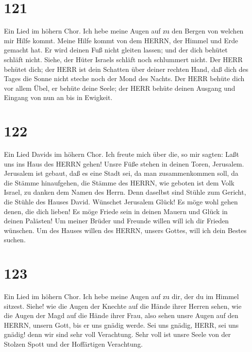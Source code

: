 \hypertarget{section-120}{%
\section{121}\label{section-120}}

 Ein Lied im höhern Chor. Ich hebe meine Augen auf zu den
Bergen von welchen mir Hilfe kommt.  Meine Hilfe kommt von
dem HERRN, der Himmel und Erde gemacht hat.  Er wird deinen
Fuß nicht gleiten lassen; und der dich behütet schläft nicht.
 Siehe, der Hüter Israels schläft noch schlummert nicht.
 Der HERR behütet dich; der HERR ist dein Schatten über
deiner rechten Hand,  daß dich des Tages die Sonne nicht
steche noch der Mond des Nachts.  Der HERR behüte dich vor
allem Übel, er behüte deine Seele;  der HERR behüte deinen
Ausgang und Eingang von nun an bis in Ewigkeit.

\hypertarget{section-121}{%
\section{122}\label{section-121}}

 Ein Lied Davids im höhern Chor. Ich freute mich über die,
so mir sagten: Laßt uns ins Haus des HERRN gehen!  Unsre
Füße stehen in deinen Toren, Jerusalem.  Jerusalem ist
gebaut, daß es eine Stadt sei, da man zusammenkommen soll, 
da die Stämme hinaufgehen, die Stämme des HERRN, wie geboten ist dem
Volk Israel, zu danken dem Namen des Herrn.  Denn daselbst
sind Stühle zum Gericht, die Stühle des Hauses David. 
Wünschet Jerusalem Glück! Es möge wohl gehen denen, die dich lieben!
 Es möge Friede sein in deinen Mauern und Glück in deinen
Palästen!  Um meiner Brüder und Freunde willen will ich dir
Frieden wünschen.  Um des Hauses willen des HERRN, unsers
Gottes, will ich dein Bestes suchen.

\hypertarget{section-122}{%
\section{123}\label{section-122}}

 Ein Lied im höhern Chor. Ich hebe meine Augen auf zu dir,
der du im Himmel sitzest.  Siehe! wie die Augen der Knechte
auf die Hände ihrer Herren sehen, wie die Augen der Magd auf die Hände
ihrer Frau, also sehen unsre Augen auf den HERRN, unsern Gott, bis er
uns gnädig werde.  Sei uns gnädig, HERR, sei uns gnädig!
denn wir sind sehr voll Verachtung.  Sehr voll ist unsre
Seele von der Stolzen Spott und der Hoffärtigen Verachtung.

